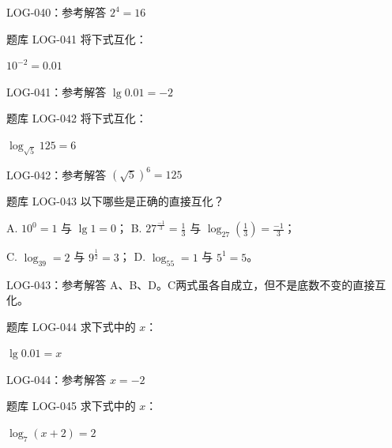 \documentclass[aspectratio=169,10pt]{beamer}
\begin{document}
\ifdefined\TeacherEdition
\begin{frame}[t]{LOG-040：参考解答}
$2^4=16$
\end{frame}
\fi

\begin{campuspractice}{题库 LOG-041}
将下式互化：\par
$10^{-2}=0.01$
\end{campuspractice}

\ifdefined\TeacherEdition
\begin{frame}[t]{LOG-041：参考解答}
$\lg0.01=-2$
\end{frame}
\fi

\begin{campuspractice}{题库 LOG-042}
将下式互化：\par
$\log_{\sqrt5}125=6$
\end{campuspractice}

\ifdefined\TeacherEdition
\begin{frame}[t]{LOG-042：参考解答}
$(\sqrt5)^6=125$
\end{frame}
\fi

\begin{campuspractice}{题库 LOG-043}
以下哪些是正确的直接互化？

A. $10^0=1$ 与 $\lg1=0$； B. $27^{\frac{-1}{3}}=\frac{1}{3}$ 与 $\log_{27}(\frac{1}{3})=\frac{-1}{3}$；

C. $\log_39=2$ 与 $9^{\frac{1}{2}}=3$； D. $\log_55=1$ 与 $5^1=5$。
\end{campuspractice}

\ifdefined\TeacherEdition
\begin{frame}[t]{LOG-043：参考解答}
A、B、D。C两式虽各自成立，但不是底数不变的直接互化。
\end{frame}
\fi

\begin{campuspractice}{题库 LOG-044}
求下式中的 $x$：\par
$\lg0.01=x$
\end{campuspractice}

\ifdefined\TeacherEdition
\begin{frame}[t]{LOG-044：参考解答}
$x=-2$
\end{frame}
\fi

\begin{campuspractice}{题库 LOG-045}
求下式中的 $x$：\par
$\log_7(x+2)=2$
\end{campuspractice}
\end{document}
